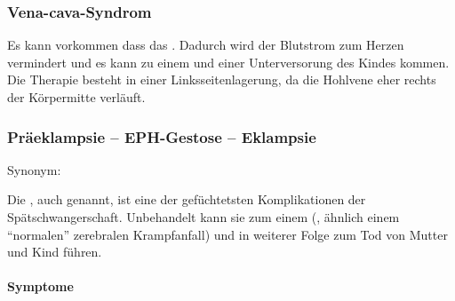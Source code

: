 \subsubsection{Vena-cava-Syndrom}
\label{topic:vena-cava-syndrom}

Es kann vorkommen dass das . Dadurch wird der Blutstrom zum Herzen
vermindert und es kann zu einem  und einer Unterversorung des Kindes kommen. Die
Therapie besteht in einer Linksseitenlagerung, da die Hohlvene eher
rechts der Körpermitte verläuft. 



\subsubsection{Präeklampsie -- EPH-Gestose -- Eklampsie}
\label{topic:eph-gestose}\label{topic:praeeklampsie}\label{topic:eklampsie}

Synonym: 

Die , auch  genannt,
ist eine der gefüchtetsten Komplikationen der Spätschwangerschaft.
Unbehandelt kann sie zum einem  (, ähnlich einem "`normalen"'
zerebralen Krampfanfall) und in weiterer Folge zum Tod von Mutter und Kind
führen.


\paragraph{Symptome}

